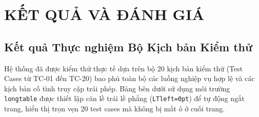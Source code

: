 \section{KẾT QUẢ VÀ ĐÁNH GIÁ}

\subsection{Kết quả Thực nghiệm Bộ Kịch bản Kiểm thử}

Hệ thống đã được kiểm thử thực tế dựa trên bộ 20 kịch bản kiểm thử (Test Cases từ TC-01 đến TC-20) bao phủ toàn bộ các luồng nghiệp vụ hợp lệ và các kịch bản cố tình truy cập trái phép. Bảng bên dưới sử dụng môi trường \texttt{longtable} được thiết lập căn lề trái lề phẳng (\texttt{LTleft=0pt}) để tự động ngắt trang, hiển thị trọn vẹn 20 test cases mà không bị mất ô ở cuối trang.

